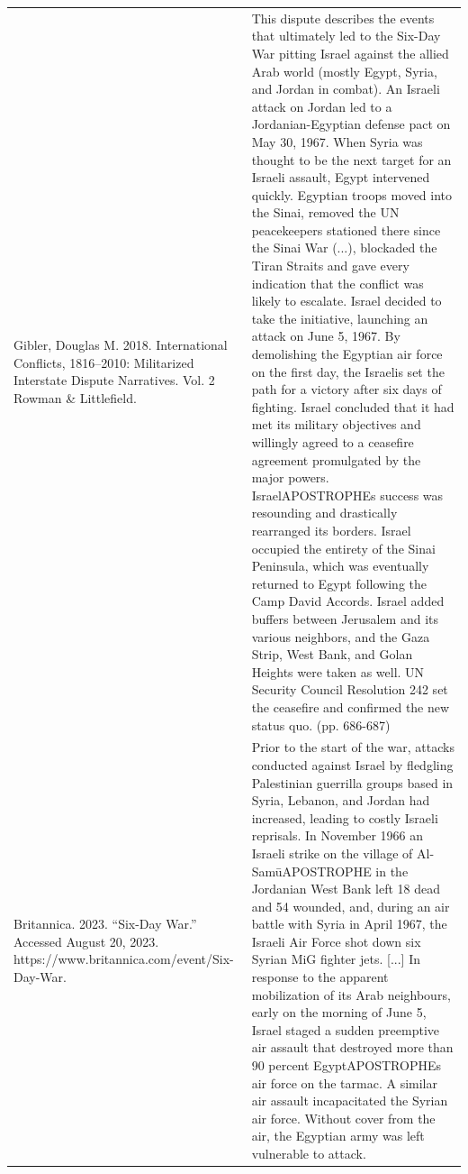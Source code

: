 {\begin{longtable}{p{}p{}}
Gibler, Douglas M. 2018. International Conflicts, 1816–2010: Militarized Interstate Dispute Narratives. Vol. 2 Rowman \& Littlefield. & This dispute describes the events that ultimately led to the Six-Day War pitting Israel against the allied Arab world (mostly Egypt, Syria, and Jordan in combat). An Israeli attack on Jordan led to a Jordanian-Egyptian defense pact on May 30, 1967. When Syria was thought to be the next target for an Israeli assault, Egypt intervened quickly. Egyptian troops moved into the Sinai, removed the UN peacekeepers stationed there since the Sinai War (...), blockaded the Tiran Straits and gave every indication that the conflict was likely to escalate. Israel decided to take the initiative, launching an attack on June 5, 1967. By demolishing the Egyptian air force on the first day, the Israelis set the path for a victory after six days of fighting. Israel concluded that it had met its military objectives and willingly agreed to a ceasefire agreement promulgated by the major powers. IsraelAPOSTROPHEs success was resounding and drastically rearranged its borders. Israel occupied the entirety of the Sinai Peninsula, which was eventually returned to Egypt following the Camp David Accords. Israel added buffers between Jerusalem and its various neighbors, and the Gaza Strip, West Bank, and Golan Heights were taken as well. UN Security Council Resolution 242 set the ceasefire and confirmed the new status quo. (pp. 686-687)
\\
Britannica. 2023. “Six-Day War.” Accessed August 20, 2023. https://www.britannica.com/event/Six-Day-War. & Prior to the start of the war, attacks conducted against Israel by fledgling Palestinian guerrilla groups based in Syria, Lebanon, and Jordan had increased, leading to costly Israeli reprisals. In November 1966 an Israeli strike on the village of Al-SamūAPOSTROPHE in the Jordanian West Bank left 18 dead and 54 wounded, and, during an air battle with Syria in April 1967, the Israeli Air Force shot down six Syrian MiG fighter jets. [...] In response to the apparent mobilization of its Arab neighbours, early on the morning of June 5, Israel staged a sudden preemptive air assault that destroyed more than 90 percent EgyptAPOSTROPHEs air force on the tarmac. A similar air assault incapacitated the Syrian air force. Without cover from the air, the Egyptian army was left vulnerable to attack.
\\

\end{longtable}}
